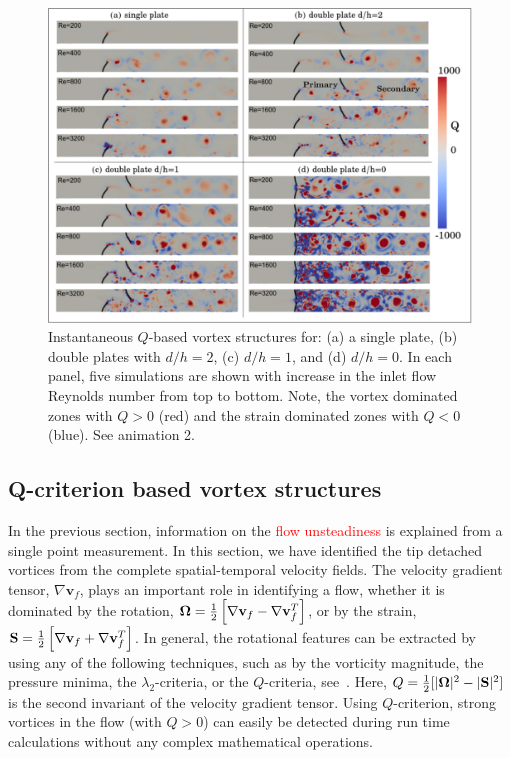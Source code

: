 \documentclass[aps,pre,twocolumn,aps,longbibliography]{revtex4-1}
\begin{document}
	\begin{figure}
		\begin{minipage}[c]{1\linewidth}
			\includegraphics[width=0.9\linewidth]{Fig15.pdf} 
		\end{minipage} 
		\caption{Instantaneous $Q$-based vortex structures for: (a) a single plate, (b) double plates with $d/h=2$, (c) $d/h=1$, and (d) $d/h=0$. In each panel, five simulations are shown with increase in the inlet flow Reynolds number from top to bottom. Note, the vortex dominated zones with $Q>0$ (red) and the strain dominated zones with $Q<0$ (blue). See animation 2.}
		\label{fig:Q_double}
	\end{figure}
	
	
	\subsection{Q-criterion based vortex structures}
	
	In the previous section, information on the \textcolor{red}{flow unsteadiness} is explained from a single point measurement. In this section, we have identified the tip detached vortices from the complete spatial-temporal velocity fields. The velocity gradient tensor, $\nabla\mathbf{v}_f$, plays an important role in identifying a flow, whether it is dominated by the rotation, $\mathbf{\boldsymbol{\Omega}}={1\over 2}\left[\nabla\mathbf{v}_f-\nabla\mathbf{v}_f^T\right]$, or by the strain, $\mathbf{S}={1\over 2}\left[\nabla\mathbf{v}_f+\nabla\mathbf{v}_f^T\right]$. In general, the rotational features can be extracted by using any of the following techniques, such as by the vorticity magnitude, the pressure minima, the $\lambda_2$-criteria, or the $Q$-criteria, see~\cite{Hunt1994, Hussain1995, Holmes2012, Rowley2014}. Here, $Q={1\over 2}[|\mathbf{\boldsymbol{\Omega}}|^2-|\mathbf{S}|^2]$ is the second invariant of the velocity gradient tensor. Using $Q$-criterion, strong vortices in the flow (with $Q>0$) can easily be detected during run time calculations without any complex mathematical operations.
	
\end{document}
